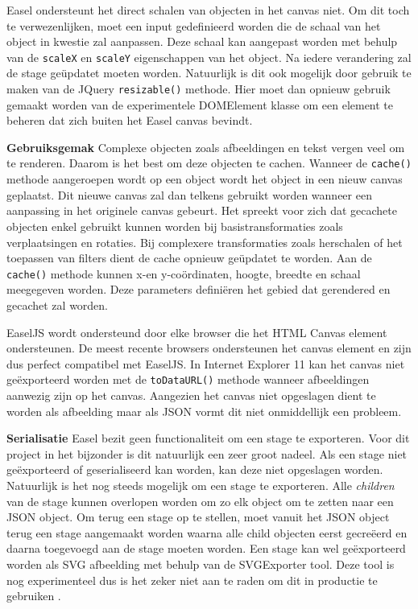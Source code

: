Easel ondersteunt het direct schalen van objecten in het canvas niet. Om dit toch te verwezenlijken, moet een input gedefinieerd worden die de schaal van het object in kwestie zal aanpassen. Deze schaal kan aangepast worden met behulp van de \texttt{scaleX} en \texttt{scaleY} eigenschappen van het object. Na iedere verandering zal de stage ge\"{u}pdatet moeten worden. Natuurlijk is dit ook mogelijk door gebruik te maken van de JQuery \texttt{resizable()} methode. Hier moet dan opnieuw gebruik gemaakt worden van de experimentele DOMElement klasse om een element te beheren dat zich buiten het Easel canvas bevindt. 

\textbf{Gebruiksgemak} \break
Complexe objecten zoals afbeeldingen en tekst vergen veel om te renderen. Daarom is het best om deze objecten te cachen. Wanneer de \texttt{cache()} methode aangeroepen wordt op een object wordt het object in een nieuw canvas geplaatst. Dit nieuwe canvas zal dan telkens gebruikt worden wanneer een aanpassing in het originele canvas gebeurt. Het spreekt voor zich dat gecachete objecten enkel gebruikt kunnen worden bij basistransformaties zoals verplaatsingen en rotaties. Bij complexere transformaties zoals herschalen of het toepassen van filters dient de cache opnieuw ge\"{u}pdatet te worden. Aan de \texttt{cache()} methode kunnen x-en y-co\"{o}rdinaten, hoogte, breedte en schaal meegegeven worden. Deze parameters defini\"{e}ren het gebied dat gerendered en gecachet zal worden. 

EaselJS wordt ondersteund door elke browser die het HTML Canvas element ondersteunen. De meest recente browsers ondersteunen het canvas element en zijn dus perfect compatibel met EaselJS. In Internet Explorer 11 kan het canvas niet ge\"{e}xporteerd worden met de \texttt{toDataURL()} methode wanneer afbeeldingen aanwezig zijn op het canvas. Aangezien het canvas niet opgeslagen dient te worden als afbeelding maar als JSON vormt dit niet onmiddellijk een probleem.

\textbf{Serialisatie} \break
Easel bezit geen functionaliteit om een stage te exporteren. Voor dit project in het bijzonder is dit natuurlijk een zeer groot nadeel. Als een stage niet ge\"{e}xporteerd of geserialiseerd kan worden, kan deze niet opgeslagen worden. Natuurlijk is het nog steeds mogelijk om een stage te exporteren. Alle \textit{children} van de stage kunnen overlopen worden om zo elk object om te zetten naar een JSON object. Om terug een stage op te stellen, moet vanuit het JSON object terug een stage aangemaakt worden waarna alle child objecten eerst gecre\"{e}erd en daarna toegevoegd aan de stage moeten worden. Een stage kan wel ge\"{e}xporteerd worden als SVG afbeelding met behulp van de SVGExporter tool.  Deze tool is nog experimenteel dus is het zeker niet aan te raden om dit in productie te gebruiken \cite{SVGExporter}. 

